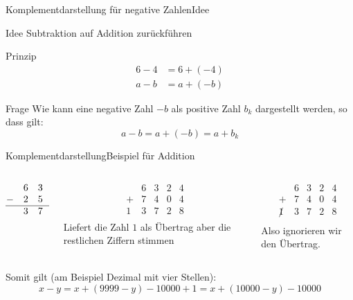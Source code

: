\documentclass[xelatex,aspectratio=169]{beamer}
\begin{document}
\begin{frame}{Komplementdarstellung für negative Zahlen}{Idee}
  \begin{block}{Idee}
    Subtraktion auf Addition zurückführen
  \end{block}
  \begin{block}{Prinzip}
    \begin{align*}
      6 - 4 & = 6 + (-4) \\
      a - b & = a + (-b)
    \end{align*}

  \end{block}
  \begin{block}{Frage}
    Wie kann eine negative Zahl $-b$ als positive Zahl $b_k$ dargestellt werden, so dass gilt:
    \[
      a - b = a+(-b) = a + b_k
    \]
  \end{block}
\end{frame}

\begin{frame}{Komplementdarstellung}{Beispiel für Addition}
  \begin{columns}[T]
    \begin{column}{0.33\textwidth}
      \centering
      \[
        \begin{matrix}
            & 6 & 3 & 2 & 4 \\
          - & 2 & 5 & 9 & 6 \\
          \hline
            & 3 & 7 & 2 & 8 \\
        \end{matrix}
      \]
    \end{column}
    \begin{column}{0.33\textwidth}
      \centering
      \[
        \begin{matrix}
            & 6 & 3 & 2 & 4 \\
          + & 7 & 4 & 0 & 4 \\
          \hline
          1 & 3 & 7 & 2 & 8 \\
        \end{matrix}
      \]
      Liefert die Zahl $1$ als Übertrag aber die restlichen Ziffern stimmen
    \end{column}
    \begin{column}{0.33\textwidth}
      \centering
      \[
        \begin{matrix}
                & 6 & 3 & 2 & 4 \\
          +     & 7 & 4 & 0 & 4 \\
          \hline
          \not1 & 3 & 7 & 2 & 8 \\
        \end{matrix}
      \]
      Also ignorieren wir den Übertrag.
    \end{column}
  \end{columns}
  \vspace{\baselineskip}
  Somit gilt (am Beispiel Dezimal mit vier Stellen):
  \[ x - y = x + (9999 - y) - 10000 + 1 = x + (10000 - y) - 10000\]

\end{frame}
\end{document}
